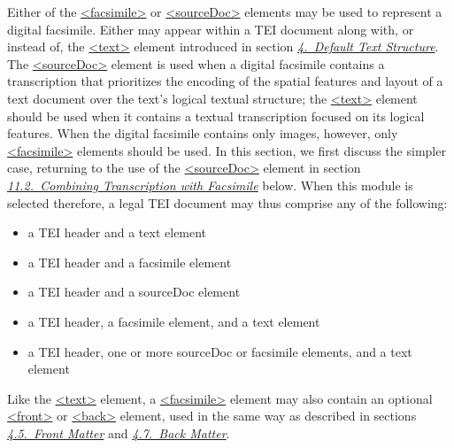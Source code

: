 Either of the \hyperref[TEI.facsimile]{<facsimile>} or \hyperref[TEI.sourceDoc]{<sourceDoc>} elements may be used to represent a digital facsimile. Either may appear within a TEI document along with, or instead of, the \hyperref[TEI.text]{<text>} element introduced in section \textit{\hyperref[DS]{4.\ Default Text Structure}}. The \hyperref[TEI.sourceDoc]{<sourceDoc>} element is used when a digital facsimile contains a transcription that prioritizes the encoding of the spatial features and layout of a text document over the text’s logical textual structure; the \hyperref[TEI.text]{<text>} element should be used when it contains a textual transcription focused on its logical features. When the digital facsimile contains only images, however, only \hyperref[TEI.facsimile]{<facsimile>} elements should be used. In this section, we first discuss the simpler case, returning to the use of the \hyperref[TEI.sourceDoc]{<sourceDoc>} element in section \textit{\hyperref[PH-transcr]{11.2.\ Combining Transcription with Facsimile}} below. When this module is selected therefore, a legal TEI document may thus comprise any of the following: \begin{itemize}
\item a TEI header and a text element
\item a TEI header and a facsimile element
\item a TEI header and a sourceDoc element
\item a TEI header, a facsimile element, and a text element
\item a TEI header, one or more sourceDoc or facsimile elements, and a text element
\end{itemize} \par
Like the \hyperref[TEI.text]{<text>} element, a \hyperref[TEI.facsimile]{<facsimile>} element may also contain an optional \hyperref[TEI.front]{<front>} or \hyperref[TEI.back]{<back>} element, used in the same way as described in sections \textit{\hyperref[DSFRONT]{4.5.\ Front Matter}} and \textit{\hyperref[DSBACK]{4.7.\ Back Matter}}.\par
